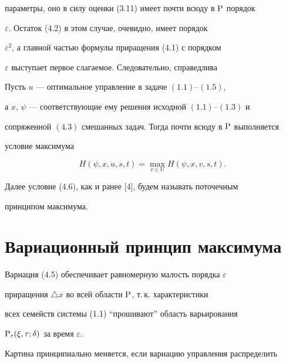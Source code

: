 параметры, оно в силу оценки (3.11) имеет почти всюду в $\P$ порядок


$\varepsilon$. Остаток (4.2) в этом случае, очевидно, имеет порядок


$\varepsilon^2$, а главной частью формулы приращения (4.1) с порядком


$\varepsilon$ выступает первое слагаемое. Следовательно, справедлива





\begin{thm}


Пусть $u$ --- оптимальное управление в задаче $(1.1)$--$(1.5)$,


а $x$, $\psi$ --- соответствующие ему решения исходной $(1.1)$--$(1.3)$ и


сопряженной $(4.3)$ смешанных задач. Тогда почти всюду в $\P$ выполняется


условие максимума


\begin{equation}


H(\psi,x,u,s,t) = \max_{v\in U} H(\psi,x,v,s,t).


\end{equation}


\end{thm}





Далее условие (4.6), как и ранее [4], будем называть поточечным


принципом максимума.





\section{Вариационный принцип максимума}





Вариация (4.5) обеспечивает равномерную малость порядка $\varepsilon$


приращения $\triangle x$ во всей области $\P$, т.\,к. характеристики


всех семейств системы (1.1) ``прошивают'' область варьирования 


${\P}_{\varepsilon}(\xi, \tau; \delta)$ за время $\varepsilon$.


Картина принципиально меняется, если вариацию управления распределить


